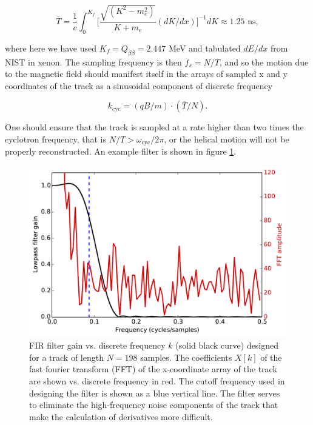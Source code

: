 \documentclass{JINST}
\begin{document}
\begin{equation}\label{eqn_T}
\overline{T} = \frac{1}{c}\int_{0}^{K_{f}} \biggl[\frac{\sqrt{(K^2-m_e^2)}}{K+m_e}(dK/dx)\biggr]^{-1} dK \approx 1.25 \,\, \mathrm{ns},
\end{equation}

\noindent where here we have used $K_{f} = Q_{\beta\beta} = 2.447$ MeV and tabulated 
$dE/dx$ from NIST \cite{NIST_mac} in xenon.  The sampling frequency is then $f_{s} = N/T$, and so the motion
due to the magnetic field should manifest itself in the arrays of sampled x and y coordinates
of the track as a sinusoidal component of discrete frequency 

\begin{equation}\label{eqn_kcyc}
k_{\mathrm{cyc}} = (qB/m)\cdot(\overline{T}/N).
\end{equation}

\noindent One should ensure that the track is sampled at a rate higher than two times the cyclotron
frequency, that is $N/T > \omega_{\mathrm{cyc}}/2\pi$, or the helical motion will not be properly
reconstructed.  An example filter is shown in figure \ref{fig_FIR}.  

\begin{figure}[!htb]
	\centering
	\includegraphics[scale=0.6]{fig/FIR_freq_resp_nmagse2_6.pdf}
	\caption{\label{fig_FIR}FIR filter gain vs. discrete frequency $k$ (solid black curve) designed for a track of length $N = 198$ samples.  The coefficients $X[k]$ of the fast fourier transform (FFT) of the x-coordinate array of the track are shown vs. discrete frequency in red.  The cutoff frequency used in designing the filter is shown as a blue vertical line.  The filter serves to eliminate the high-frequency noise components of the track that make the calculation of derivatives more difficult.}
\end{figure}
\end{document}
